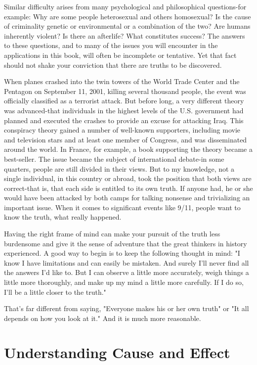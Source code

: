 \documentclass{book}
\begin{document}
Similar difficulty arises from many psychological and philosophical questions-for example: Why are some people heterosexual and others homosexual? Is the cause of criminality genetic or environmental or a combination of the two? Are humans inherently violent? Is there an afterlife?  What constitutes success? The answers to these questions, and to many of the issues you will encounter in the applications in this book, will often be incomplete or tentative. Yet that fact should not shake your conviction that there are truths to be discovered.

When planes crashed into the twin towers of the World Trade Center and the Pentagon on September 11, 2001, killing several thousand people, the event was officially classified as a terrorist attack. But before long, a very different theory was advanced-that individuals in the highest levels of the U.S. government had planned and executed the crashes to provide an excuse for attacking Iraq. This conspiracy theory gained a number of well-known supporters, including movie and television stars and at least one member of Congress, and was disseminated around the world. In France, for example, a book supporting the theory became a best-seller.  The issue became the subject of international debate-in some quarters, people are still divided in their views. But to my knowledge, not a single individual, in this country or abroad, took the position that both views are correct-that is, that each side is entitled to its own truth. If anyone had, he or she would have been attacked by both camps for talking nonsense and trivializing an important issue. When it comes to significant events like 9/11, people want to know the truth, what really happened.

Having the right frame of mind can make your pursuit of the truth less burdensome and give it the sense of adventure that the great thinkers in history experienced. A good way to begin is to keep the following thought in mind: "I know I have limitations and can easily be mistaken. And surely I’ll never find all the answers I’d like to. But I can observe a little more accurately, weigh things a little more thoroughly, and make up my mind a little more carefully. If I do so, I’ll be a little closer to the truth."

That’s far different from saying, "Everyone makes his or her own truth" or "It all depends on how you look at it." And it is much more reasonable.

\section{Understanding Cause and Effect  }
\end{document}
